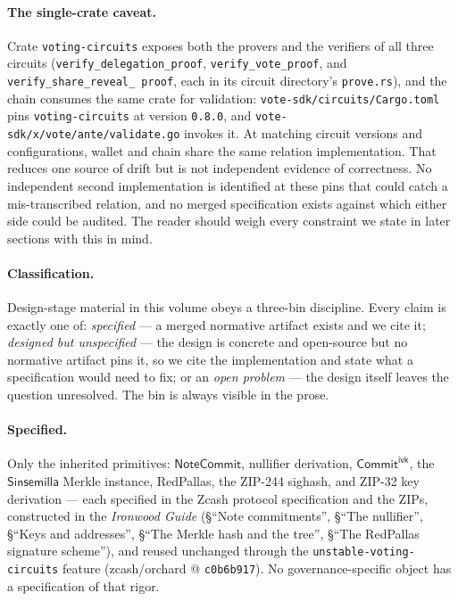 \documentclass[11pt,a4paper]{article}
\theoremstyle{definition}
\newcommand{\NoteCommit}{\ensuremath{\mathsf{NoteCommit}}}
\newcommand{\Sinsemilla}{\ensuremath{\mathsf{Sinsemilla}}}
\newcommand{\CommitIvk}{\ensuremath{\mathsf{Commit}^{\mathsf{ivk}}}}
\begin{document}
\paragraph{The single-crate caveat.} Crate \texttt{voting-circuits} exposes
both the provers and the verifiers of all three circuits
(\texttt{verify\_\allowbreak delegation\_\allowbreak proof},
\texttt{verify\_\allowbreak vote\_\allowbreak proof}, and
\texttt{verify\_\allowbreak share\_\allowbreak reveal\_\allowbreak
proof}, each in its circuit directory's
\texttt{prove.rs}), and the
chain consumes the same crate for validation:
\texttt{vote-sdk/circuits/Cargo.toml} pins \texttt{voting-circuits} at
version \texttt{0.8.0}, and \texttt{vote-sdk/x/vote/ante/validate.go}
invokes it. At matching circuit versions and configurations, wallet and
chain share the same relation implementation. That reduces one source of
drift but is not independent evidence of correctness. No independent
second implementation is identified at these pins that could catch a
mis-transcribed relation, and no merged specification exists against which
either side could be audited. The reader should weigh every constraint we
state in later sections with this in mind.

\paragraph{Classification.} Design-stage material in this volume obeys a
three-bin discipline. Every claim is exactly one of: \emph{specified} --- a
merged normative artifact exists and we cite it; \emph{designed but
unspecified} --- the design is concrete and open-source but no normative
artifact pins it, so we cite the implementation and state what a
specification would need to fix; or an \emph{open problem} --- the design
itself leaves the question unresolved. The bin is always visible in the
prose.

\paragraph{Specified.} Only the inherited primitives: \NoteCommit{},
nullifier derivation, \CommitIvk{}, the \Sinsemilla{} Merkle instance,
RedPallas, the ZIP-244 sighash, and ZIP-32 key derivation --- each specified
in the Zcash protocol specification and the ZIPs, constructed in the
\emph{Ironwood Guide} (\S``Note commitments'', \S``The nullifier'',
\S``Keys and addresses'', \S``The Merkle hash and the tree'', \S``The RedPallas
signature scheme''), and reused unchanged through the
\texttt{unstable-voting-circuits} feature (zcash/orchard @
\texttt{c0b6b917}). No governance-specific object has a specification of
that rigor.
\end{document}
